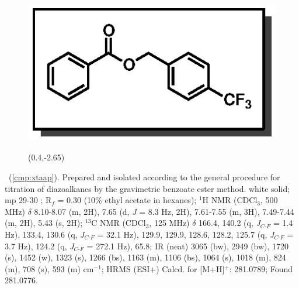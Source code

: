 \vspace{10pt}
\begin{figure}
  \vspace{-30pt}
  \begin{center}
    \includegraphics[scale=0.8]{chp_asymmetric/images/xtaap}
           \begin{textblock}{1}(0.4,-2.65)  \end{textblock}
  \end{center}
  \vspace{-40pt}
\end{figure}\noindent \textbf{\CMPxtaap}\ (\ref{cmp:xtaap}). Prepared and
isolated according to the general procedure for titration of diazoalkanes by the
gravimetric benzoate ester method. white solid; mp 29-30 \degc; R$_f$ = 0.30
(10\% ethyl acetate in hexanes); $^1$H NMR (CDCl$_3$, 500 MHz) $\delta$ 8.10-8.07 (m,
2H), 7.65 (d, \textit{J} = 8.3 Hz, 2H), 7.61-7.55 (m, 3H), 7.49-7.44 (m, 2H),
5.43 (s, 2H); $^{13}$C NMR (CDCl$_3$, 125 MHz) $\delta$ 166.4, 140.2 (q,
\textit{J}$_{C\mbox{-}F}$ = 1.4 Hz), 133.4, 130.6 (q, \textit{J}$_{C\mbox{-}F}$
= 32.1 Hz), 129.9, 129.9, 128.6, 128.2, 125.7 (q, \textit{J}$_{C\mbox{-}F}$ =
3.7 Hz), 124.2 (q, \textit{J}$_{C\mbox{-}F}$ = 272.1 Hz), 65.8; IR (neat) 3065
(bw), 2949 (bw), 1720 (s), 1452 (w), 1323 (s), 1266 (bs), 1163 (m), 1106 (bs),
1064 (s), 1018 (m), 824 (m), 708 (s), 593 (m) cm$^{-1}$; HRMS (ESI+) Calcd. for
 [M+H]$^+$: 281.0789; Found 281.0776.

